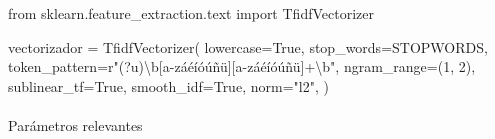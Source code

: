\documentclass[
  spanish,
  letterpaper,
  DIV=11,
  numbers=noendperiod]{scrartcl}
\makeatletter
\let\oldparagraph\paragraph
\renewcommand{\paragraph}{
    \@ifstar
      \xxxParagraphStar
      \xxxParagraphNoStar
  }
\newcommand{\xxxParagraphStar}[1]{\oldparagraph*{#1}\mbox{}}
\newcommand{\xxxParagraphNoStar}[1]{\oldparagraph{#1}\mbox{}}
\newenvironment{Shaded}{\begin{snugshade}}{\end{snugshade}}
\newcommand{\DecValTok}[1]{\textcolor[rgb]{0.68,0.00,0.00}{#1}}
\newcommand{\FunctionTok}[1]{\textcolor[rgb]{0.28,0.35,0.67}{#1}}
\newcommand{\ImportTok}[1]{\textcolor[rgb]{0.00,0.46,0.62}{#1}}
\newcommand{\NormalTok}[1]{\textcolor[rgb]{0.00,0.23,0.31}{#1}}
\newcommand{\OperatorTok}[1]{\textcolor[rgb]{0.37,0.37,0.37}{#1}}
\newcommand{\PreprocessorTok}[1]{\textcolor[rgb]{0.68,0.00,0.00}{#1}}
\newcommand{\StringTok}[1]{\textcolor[rgb]{0.13,0.47,0.30}{#1}}
\newcommand{\VariableTok}[1]{\textcolor[rgb]{0.07,0.07,0.07}{#1}}
\newcommand{\VerbatimStringTok}[1]{\textcolor[rgb]{0.13,0.47,0.30}{#1}}
\makeatother
\begin{document}
\begin{Shaded}
\begin{Highlighting}[]
\ImportTok{from}\NormalTok{ sklearn.feature\_extraction.text }\ImportTok{import}\NormalTok{ TfidfVectorizer}

\NormalTok{vectorizador }\OperatorTok{=}\NormalTok{ TfidfVectorizer(}
\NormalTok{    lowercase}\OperatorTok{=}\VariableTok{True}\NormalTok{,}
\NormalTok{    stop\_words}\OperatorTok{=}\NormalTok{STOPWORDS,}
\NormalTok{    token\_pattern}\OperatorTok{=}\VerbatimStringTok{r"}\FunctionTok{(?u)}\DecValTok{\textbackslash{}b}\PreprocessorTok{[a{-}záéíóúñü][a{-}záéíóúñü]}\OperatorTok{+}\DecValTok{\textbackslash{}b}\VerbatimStringTok{"}\NormalTok{,}
\NormalTok{    ngram\_range}\OperatorTok{=}\NormalTok{(}\DecValTok{1}\NormalTok{, }\DecValTok{2}\NormalTok{),}
\NormalTok{    sublinear\_tf}\OperatorTok{=}\VariableTok{True}\NormalTok{,}
\NormalTok{    smooth\_idf}\OperatorTok{=}\VariableTok{True}\NormalTok{,}
\NormalTok{    norm}\OperatorTok{=}\StringTok{"l2"}\NormalTok{,}
\NormalTok{)}
\end{Highlighting}
\end{Shaded}

\paragraph{Parámetros relevantes}\label{paruxe1metros-relevantes}
\end{document}
